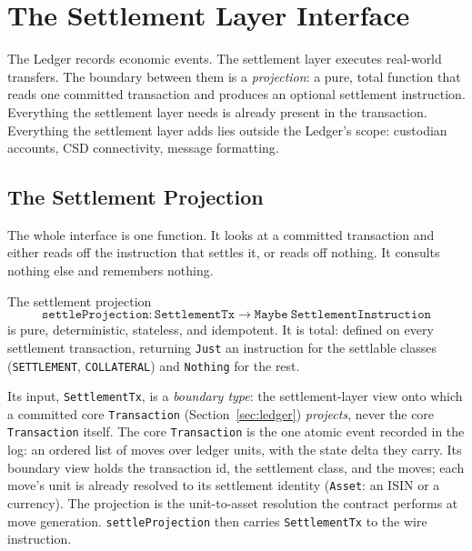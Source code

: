 \section{The Settlement Layer Interface}
\label{sec:settlement}

The Ledger records economic events. The settlement layer executes real-world transfers. The boundary between them is a \emph{projection}: a pure, total function that reads one committed transaction and produces an optional settlement instruction. Everything the settlement layer needs is already present in the transaction. Everything the settlement layer adds lies outside the Ledger's scope: custodian accounts, CSD connectivity, message formatting.

\subsection{The Settlement Projection}
\label{sec:settlement-projection}

The whole interface is one function. It looks at a committed transaction and either reads off the instruction that settles it, or reads off nothing. It consults nothing else and remembers nothing.

\begin{definition}
\label{def:settle-projection}
The settlement projection
\[
\texttt{settleProjection} : \texttt{SettlementTx} \to \texttt{Maybe}\ \texttt{SettlementInstruction}
\]
is pure, deterministic, stateless, and idempotent. It is total: defined on every settlement transaction, returning \texttt{Just} an instruction for the settlable classes (\texttt{SETTLEMENT}, \texttt{COLLATERAL}) and \texttt{Nothing} for the rest.
\end{definition}

Its input, \texttt{SettlementTx}, is a \emph{boundary type}: the settlement-layer view onto which a committed core \texttt{Transaction} (Section~\ref{sec:ledger}) \emph{projects}, never the core \texttt{Transaction} itself. The core \texttt{Transaction} is the one atomic event recorded in the log: an ordered list of moves over ledger units, with the state delta they carry. Its boundary view holds the transaction id, the settlement class, and the moves; each move's unit is already resolved to its settlement identity (\texttt{Asset}: an ISIN or a currency). The projection is the unit-to-asset resolution the contract performs at move generation. \texttt{settleProjection} then carries \texttt{SettlementTx} to the wire instruction.


